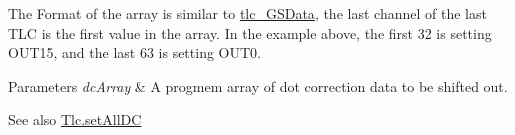 The Format of the array is similar to \hyperlink{Tlc5940_8h_a1560009c42233131f7abe72e8113f793}{tlc\+\_\+\+G\+S\+Data}, the last channel of the last T\+LC is the first value in the array. In the example above, the first 32 is setting O\+U\+T15, and the last 63 is setting O\+U\+T0.


\begin{DoxyParams}{Parameters}
{\em dc\+Array} & A progmem array of dot correction data to be shifted out. \\
\hline
\end{DoxyParams}
\begin{DoxySeeAlso}{See also}
\hyperlink{group__CoreFunctions_ga5b39a8719693ebb40aaa1005ab6c7323}{Tlc.\+set\+All\+DC } 
\end{DoxySeeAlso}
